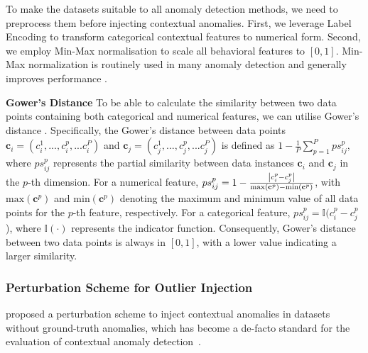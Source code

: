 \documentclass[pdflatex,sn-basic]{sn-jnl}%
\theoremstyle{thmstyleone}%
\theoremstyle{thmstyletwo}%
\theoremstyle{thmstylethree}%
\begin{document}
To make the datasets suitable to all anomaly detection methods, we need to preprocess them before injecting contextual anomalies. First, we leverage Label Encoding \citep{seger2018investigation} to transform categorical contextual features to  numerical form. Second, we employ Min-Max normalisation to scale all behavioral features to $[0,1]$. Min-Max normalization is routinely used in many anomaly detection and generally improves performance \citep{kandanaarachchi2020normalization}.

\textbf{Gower's Distance} To be able to calculate the similarity between two data points containing both categorical and numerical features, we can utilise Gower's distance \citep{gower1971general}. Specifically, the Gower's distance between data points $\mathbf{c}_{i} = (c_{i}^{1},...,c_{i}^{p},...c_{i}^{P})$ and $\mathbf{c}_{j} = (c_{j}^{1},...,c_{j}^{p},...c_{j}^{P})$ is defined as $1- \frac{1}{P}\sum_{p=1}^{P}ps_{ij}^{p}$, where $ps_{ij}^{p}$ represents the partial similarity between data instances $\mathbf{c}_{i}$ and $\mathbf{c}_{j}$ in the $p$-th dimension. For a numerical feature, $ps_{ij}^{p} = 1- \frac{\abs{c_{i}^{p}-c_{j}^{p}}}{\mathrm{max}(\mathbf{c}^p)-\mathrm{min}(\mathbf{c}^p)}$, with $\mathrm{max}(\mathbf{c}^p)$ and $\mathrm{min}(\mathbf{c}^p)$ denoting the maximum and minimum value of all data points for the $p$-th feature, respectively. For a categorical feature, $ps_{ij}^{p} = \mathbb{I}(c_{i}^p-c_{j}^p$), where $\mathbb{I}(\cdot)$ represents the indicator function. Consequently, Gower's distance between two data points is always in $[0,1]$, with a lower value indicating a larger similarity.

\subsubsection{Perturbation Scheme for Outlier Injection}

\cite{song2007conditional} proposed a perturbation scheme to inject contextual anomalies in datasets without ground-truth anomalies, which has become a de-facto standard for the evaluation of contextual anomaly detection~\citep{song2007conditional, liang2016robust, zheng2017contextual, calikus2021wisdom}.

\end{document}
